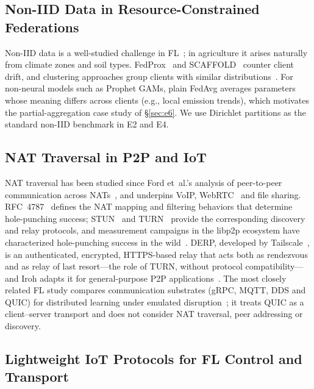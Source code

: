 \subsection{Non-IID Data in Resource-Constrained Federations}

Non-IID data is a well-studied challenge in FL~\cite{zhao2018noniid,li2022noniid,kairouz2021}; in agriculture it arises naturally from climate zones and soil types. FedProx~\cite{fedprox2020} and SCAFFOLD~\cite{scaffold2020} counter client drift, and clustering approaches group clients with similar distributions~\cite{briggs2020cluster}. For non-neural models such as Prophet GAMs, plain FedAvg averages parameters whose meaning differs across clients (e.g., local emission trends), which motivates the partial-aggregation case study of \S\ref{sec:e6}. We use Dirichlet partitions as the standard non-IID benchmark in E2 and E4.

\subsection{NAT Traversal in P2P and IoT}

NAT traversal has been studied since Ford et~al.'s analysis of peer-to-peer communication across NATs~\cite{ford2005,rfc5128}, and underpins VoIP, WebRTC~\cite{webrtc2021} and file sharing. RFC~4787~\cite{rfc4787} defines the NAT mapping and filtering behaviors that determine hole-punching success; STUN~\cite{rfc8489} and TURN~\cite{rfc8656} provide the corresponding discovery and relay protocols, and measurement campaigns in the libp2p ecosystem have characterized hole-punching success in the wild~\cite{seemann2022}. DERP, developed by Tailscale~\cite{tailscale2023}, is an authenticated, encrypted, HTTPS-based relay that acts both as rendezvous and as relay of last resort---the role of TURN, without protocol compatibility---and Iroh adapts it for general-purpose P2P applications~\cite{iroh2024}. The most closely related FL study compares communication substrates (gRPC, MQTT, DDS and QUIC) for distributed learning under emulated disruption~\cite{kutlu2026}; it treats QUIC as a client--server transport and does not consider NAT traversal, peer addressing or discovery.

\subsection{Lightweight IoT Protocols for FL Control and Transport}

